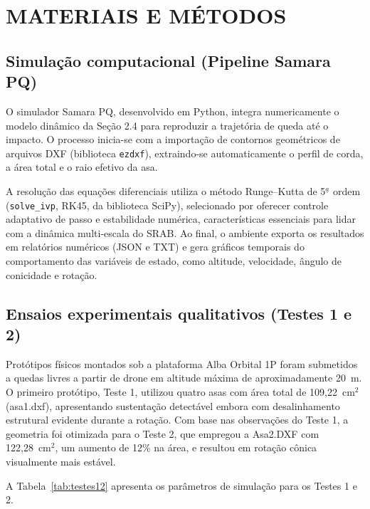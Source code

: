 
\section{MATERIAIS E MÉTODOS}

\subsection{Simulação computacional (Pipeline Samara PQ)}

O simulador Samara PQ, desenvolvido em Python, integra numericamente o modelo dinâmico da Seção 2.4 para reproduzir a trajetória de queda até o impacto. O processo inicia-se com a importação de contornos geométricos de arquivos DXF (biblioteca \texttt{ezdxf}), extraindo-se automaticamente o perfil de corda, a área total e o raio efetivo da asa.

A resolução das equações diferenciais utiliza o método Runge--Kutta de 5$^{\underline{a}}$ ordem (\texttt{solve\_ivp}, RK45, da biblioteca SciPy), selecionado por oferecer controle adaptativo de passo e estabilidade numérica, características essenciais para lidar com a dinâmica multi-escala do SRAB. Ao final, o ambiente exporta os resultados em relatórios numéricos (JSON e TXT) e gera gráficos temporais do comportamento das variáveis de estado, como altitude, velocidade, ângulo de conicidade e rotação.

\subsection{Ensaios experimentais qualitativos (Testes 1 e 2)}

Protótipos físicos montados sob a plataforma Alba Orbital 1P foram submetidos a quedas livres a partir de drone em altitude máxima de aproximadamente 20~m. O primeiro protótipo, Teste 1, utilizou quatro asas com área total de 109,22~cm$^2$ (asa1.dxf), apresentando sustentação detectável embora com desalinhamento estrutural evidente durante a rotação. Com base nas observações do Teste 1, a geometria foi otimizada para o Teste 2, que empregou a Asa2.DXF com 122,28~cm$^2$, um aumento de 12\% na área, e resultou em rotação cônica visualmente mais estável.

A Tabela~\ref{tab:testes12} apresenta os parâmetros de simulação para os Testes 1 e 2.

